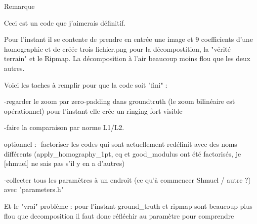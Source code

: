 Remarque

Ceci est un code que j’aimerais définitif.

Pour l'instant il se contente de prendre en entrée une image et 9 coefficients d'une homographie et de créée trois fichier.png pour la décompostition, la "vérité terrain" et le Ripmap.
La décomposition à l'air beaucoup moins flou que les deux autres.



Voici les taches à remplir pour que la code soit "fini" :

	-regarder le zoom par zero-padding dans groundtruth (le zoom bilinéaire est opérationnel)
		pour l'instant elle crée un ringing fort visible
	
	-faire la comparaison par norme L1/L2.
	
	
	
optionnel :
	-factoriser les codes qui sont actuellement redéfinit avec des noms différents (apply_homography_1pt, eq et good_modulus ont été factorisés, je [shmuel] ne sais pas s'il y en a d'autres) 
	
	-collecter tous les paramètres à un endroit (ce qu'à commencer Shmuel / autre ?) avec "parameters.h"
	
	
	
Et le "vrai" problème :
	pour l'instant ground_truth et ripmap sont beaucoup plus flou que decomposition
	il faut donc réfléchir au paramètre pour comprendre
